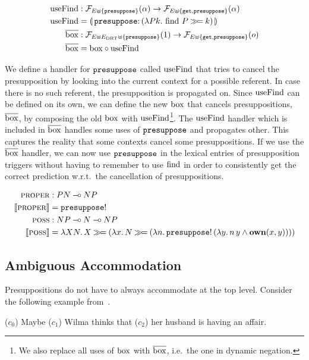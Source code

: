 \begin{align*}
  \useFind &: \FF_{E \uplus \{\op{presuppose}\}}(\alpha) \to \FF_{E \uplus \{\op{get}, \op{presuppose}\}}(\alpha) \\
  \useFind &= \banana{\onto{\op{presuppose}}{(\lam{P k}{\ap{\find}{P} \hsbind k})}} \\
  \DBOX &: \FF_{E \uplus E_\DRT \uplus \{\op{presuppose}\}}(1) \to \FF_{E \uplus \{\op{get}, \op{presuppose}\}}(o) \\
  \DBOX &= \BOX \circ \useFind
\end{align*}

We define a handler for $\mathtt{presuppose}$ called $\operatorname{useFind}$ that tries to
cancel the presupposition by looking into the current context for a
possible referent. In case there is no such referent, the presupposition is
propagated on. Since $\operatorname{useFind}$ can be defined on its own, we can define
the new $\mathrm{box}$ that cancels presuppositions, $\overline{\mathrm{box}}$, by composing the old
$\mathrm{box}$ with $\operatorname{useFind}$\footnote{We also replace all uses of $\mathrm{box}$ with
  $\overline{\mathrm{box}}$, i.e.\ the one in dynamic negation.}. The $\operatorname{useFind}$ handler
which is included in $\overline{\mathrm{box}}$ handles some uses of $\mathtt{presuppose}$ and
propagates other. This captures the reality that some contexts cancel some
presuppositions. If we use the $\overline{\mathrm{box}}$ handler, we can now use
$\mathtt{presuppose}$ in the lexical entries of presupposition triggers without
having to remember to use $\operatorname{find}$ in order to consistently get the correct
prediction w.r.t.\ the cancellation of presuppositions.

\begin{align*}
  \textsc{proper} &: PN \mathbin{{-}\mkern-3.5mu{\circ}} NP \\
  \llbracket \textsc{proper} \rrbracket &= \mathtt{presuppose}! \\
  \textsc{poss} &: NP \mathbin{{-}\mkern-3.5mu{\circ}} N \mathbin{{-}\mkern-3.5mu{\circ}} NP \\
  \llbracket \textsc{poss} \rrbracket &= \lambda X N.\, X \mathbin{\gg\!=} (\lambda x.\, N \mathbin{\gg\!=} (\lambda n.\, \mathtt{presuppose}!\,(\lambda y.\, n\,y \land \textbf{own}(x, y))))
\end{align*}


\subsection{Ambiguous Accommodation}
\label{ssec:ambiguous-accommodation}

Presuppositions do not have to always accommodate at the top
level. Consider the following example from~\cite{sep-presupposition}.

\begin{exe}
  \ex \label{ex:wilma} ($c_0$) Maybe ($c_1$) Wilma thinks that ($c_2$) her husband is having an affair.
\end{exe}

